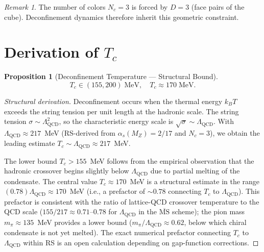 \documentclass[12pt,a4paper]{article}
\newtheorem{proposition}[theorem]{Proposition}
\theoremstyle{definition}
\theoremstyle{remark}
\newtheorem{remark}[theorem]{Remark}
\begin{document}
\begin{remark}
The number of colors $N_c = 3$ is forced by $D = 3$ (face pairs of
the cube).  Deconfinement dynamics therefore inherit this geometric
constraint.
\end{remark}

\section{Derivation of $T_c$}
\label{sec:derivation}

\begin{proposition}[Deconfinement Temperature --- Structural Bound]
\label{thm:tc}
\begin{equation}
  T_c \in (155, 200)\;\mathrm{MeV}, \quad T_c \approx
  170\;\mathrm{MeV}.
\end{equation}
\end{proposition}

\begin{proof}[Structural derivation]
Deconfinement occurs when the thermal energy $k_B T$ exceeds the
string tension per unit length at the hadronic scale.  The string
tension $\sigma \sim \Lambda_{\mathrm{QCD}}^2$, so the characteristic
energy scale is $\sqrt{\sigma} \sim \Lambda_{\mathrm{QCD}}$.  With
$\Lambda_{\mathrm{QCD}} \approx 217$~MeV (RS-derived from
$\alpha_s(M_Z) = 2/17$ and $N_c = 3$), we obtain the leading estimate
$T_c \sim \Lambda_{\mathrm{QCD}} \approx 217$~MeV.

The lower bound $T_c > 155$~MeV follows from the empirical observation
that the hadronic crossover begins slightly below $\Lambda_{\mathrm{QCD}}$
due to partial melting of the condensate.  The central value $T_c \approx 170$~MeV is a structural
estimate in the range $(0.78)\Lambda_{\mathrm{QCD}} \approx 170$~MeV
(i.e., a prefactor of $\sim 0.78$ connecting $T_c$ to
$\Lambda_{\mathrm{QCD}}$).  This prefactor is consistent with the
ratio of lattice-QCD crossover temperature to the QCD scale
($155/217 \approx 0.71$--$0.78$ for $\Lambda_{\mathrm{QCD}}$ in the
$\overline{\mathrm{MS}}$ scheme); the pion mass $m_\pi \approx 135$~MeV
provides a lower bound ($m_\pi / \Lambda_{\mathrm{QCD}} \approx 0.62$,
below which chiral condensate is not yet melted).
The exact numerical prefactor connecting $T_c$ to $\Lambda_{\mathrm{QCD}}$
within RS is an open calculation depending on gap-function corrections.
\end{proof}
\end{document}
